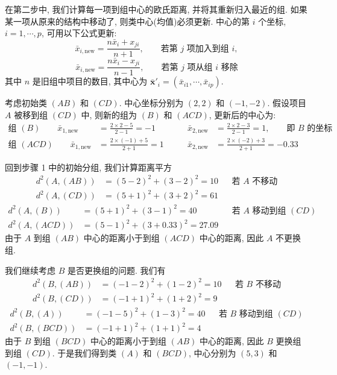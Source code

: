 
在第二步中, 我们计算每一项到组中心的欧氏距离, 并将其重新归入最近的组. 如果某一项从原来的结构中移动了, 则类中心(均值)必须更新.
中心的第 $i$ 个坐标, $i=1,\cdots,p$, 可用以下公式更新:
\[
\bar{x}_{i,\text{new}}=\frac{n\bar{x}_i+x_{ji}}{n+1}, \qquad \text{若第 } j \text{ 项加入到组 } i,
\]
\[
\bar{x}_{i,\text{new}}=\frac{n\bar{x}_i-x_{ji}}{n-1}, \qquad \text{若第 } j \text{ 项从组 } i \text{ 移除}
\]
其中 $n$ 是旧组中项目的数目, 其中心为 $\bar{\mathbf{x}}'_i=(\bar{x}_{i1},\cdots,\bar{x}_{ip})$.

考虑初始类 $(AB)$ 和 $(CD)$. 中心坐标分别为 $(2,2)$ 和 $(-1,-2)$. 假设项目 $A$ 被移到组 $(CD)$ 中, 则新的组为 $(B)$ 和 $(ACD)$, 更新后的中心为:
\[
\begin{aligned}
\text{组 }(B)\qquad \bar{x}_{1,\text{new}}&=\frac{2\times 2-5}{2-1}=-1 &\qquad
\bar{x}_{2,\text{new}}&=\frac{2\times 2-3}{2-1}=1, \qquad \text{即 } B \text{ 的坐标}\\
\text{组 }(ACD)\qquad \bar{x}_{1,\text{new}}&=\frac{2\times(-1)+5}{2+1}=1 &\qquad
\bar{x}_{2,\text{new}}&=\frac{2\times(-2)+3}{2+1}=-0.33
\end{aligned}
\]

回到步骤 1 中的初始分组, 我们计算距离平方
\[
\begin{aligned}
d^{2}(A,(AB))&=(5-2)^{2}+(3-2)^{2}=10 &&\text{若 } A \text{ 不移动}\\
d^{2}(A,(CD))&=(5+1)^{2}+(3+2)^{2}=61
\end{aligned}
\]
\[
\begin{aligned}
d^{2}(A,(B))&=(5+1)^{2}+(3-1)^{2}=40 &&\text{若 } A \text{ 移动到组 }(CD)\\
d^{2}(A,(ACD))&=(5-1)^{2}+(3+0.33)^{2}=27.09
\end{aligned}
\]
由于 $A$ 到组 $(AB)$ 中心的距离小于到组 $(ACD)$ 中心的距离, 因此 $A$ 不更换组.

我们继续考虑 $B$ 是否更换组的问题. 我们有
\[
\begin{aligned}
d^{2}(B,(AB))&=(-1-2)^{2}+(1-2)^{2}=10 &&\text{若 } B \text{ 不移动}\\
d^{2}(B,(CD))&=(-1+1)^{2}+(1+2)^{2}=9
\end{aligned}
\]
\[
\begin{aligned}
d^{2}(B,(A))&=(-1-5)^{2}+(1-3)^{2}=40 &&\text{若 } B \text{ 移动到组 }(CD)\\
d^{2}(B,(BCD))&=(-1+1)^{2}+(1+1)^{2}=4
\end{aligned}
\]
由于 $B$ 到组 $(BCD)$ 中心的距离小于到组 $(AB)$ 中心的距离, 因此 $B$ 更换组到组 $(CD)$. 于是我们得到类 $(A)$ 和 $(BCD)$, 中心分别为 $(5,3)$ 和 $(-1,-1)$.

